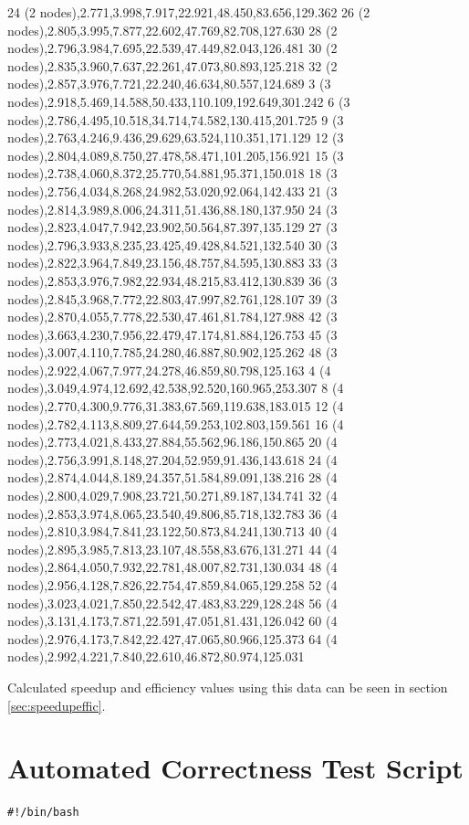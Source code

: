 \documentclass[11pt]{article}
\begin{document}
\begin{appendices}
\begin{table}[H]
{24 (2 nodes),2.771,3.998,7.917,22.921,48.450,83.656,129.362
26 (2 nodes),2.805,3.995,7.877,22.602,47.769,82.708,127.630
28 (2 nodes),2.796,3.984,7.695,22.539,47.449,82.043,126.481
30 (2 nodes),2.835,3.960,7.637,22.261,47.073,80.893,125.218
32 (2 nodes),2.857,3.976,7.721,22.240,46.634,80.557,124.689
3 (3 nodes),2.918,5.469,14.588,50.433,110.109,192.649,301.242
6 (3 nodes),2.786,4.495,10.518,34.714,74.582,130.415,201.725
9 (3 nodes),2.763,4.246,9.436,29.629,63.524,110.351,171.129
12 (3 nodes),2.804,4.089,8.750,27.478,58.471,101.205,156.921
15 (3 nodes),2.738,4.060,8.372,25.770,54.881,95.371,150.018
18 (3 nodes),2.756,4.034,8.268,24.982,53.020,92.064,142.433
21 (3 nodes),2.814,3.989,8.006,24.311,51.436,88.180,137.950
24 (3 nodes),2.823,4.047,7.942,23.902,50.564,87.397,135.129
27 (3 nodes),2.796,3.933,8.235,23.425,49.428,84.521,132.540
30 (3 nodes),2.822,3.964,7.849,23.156,48.757,84.595,130.883
33 (3 nodes),2.853,3.976,7.982,22.934,48.215,83.412,130.839
36 (3 nodes),2.845,3.968,7.772,22.803,47.997,82.761,128.107
39 (3 nodes),2.870,4.055,7.778,22.530,47.461,81.784,127.988
42 (3 nodes),3.663,4.230,7.956,22.479,47.174,81.884,126.753
45 (3 nodes),3.007,4.110,7.785,24.280,46.887,80.902,125.262
48 (3 nodes),2.922,4.067,7.977,24.278,46.859,80.798,125.163
4 (4 nodes),3.049,4.974,12.692,42.538,92.520,160.965,253.307
8 (4 nodes),2.770,4.300,9.776,31.383,67.569,119.638,183.015
12 (4 nodes),2.782,4.113,8.809,27.644,59.253,102.803,159.561
16 (4 nodes),2.773,4.021,8.433,27.884,55.562,96.186,150.865
20 (4 nodes),2.756,3.991,8.148,27.204,52.959,91.436,143.618
24 (4 nodes),2.874,4.044,8.189,24.357,51.584,89.091,138.216
28 (4 nodes),2.800,4.029,7.908,23.721,50.271,89.187,134.741
32 (4 nodes),2.853,3.974,8.065,23.540,49.806,85.718,132.783
36 (4 nodes),2.810,3.984,7.841,23.122,50.873,84.241,130.713
40 (4 nodes),2.895,3.985,7.813,23.107,48.558,83.676,131.271
44 (4 nodes),2.864,4.050,7.932,22.781,48.007,82.731,130.034
48 (4 nodes),2.956,4.128,7.826,22.754,47.859,84.065,129.258
52 (4 nodes),3.023,4.021,7.850,22.542,47.483,83.229,128.248
56 (4 nodes),3.131,4.173,7.871,22.591,47.051,81.431,126.042
60 (4 nodes),2.976,4.173,7.842,22.427,47.065,80.966,125.373
64 (4 nodes),2.992,4.221,7.840,22.610,46.872,80.974,125.031
}
\end{table}

{\normalsize Calculated speedup and efficiency values using this data can be seen in section \ref{sec:speedupeffic}.}

\newpage
{\color{indigo}
\section{Automated Correctness Test Script}
\label{apdx:correctnesstest}}
\begin{verbatim}
#!/bin/bash


\end{verbatim}
\end{appendices}
\end{document}
